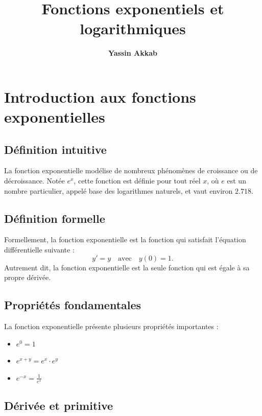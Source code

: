 \documentclass{article}
\title{\textbf{Fonctions exponentiels et  logarithmiques}}
\author{\textbf{Yassin Akkab}}
\begin{document}
	
	\maketitle
	
	
	
	\tableofcontents
	
	\newpage
	
	\section{Introduction aux fonctions exponentielles}
	
	\subsection{Définition intuitive}
	
	La fonction exponentielle modélise de nombreux phénomènes de croissance ou de décroissance. Notée \( e^x \), cette fonction est définie pour tout réel \( x \), où \( e \) est un nombre particulier, appelé base des logarithmes naturels, et vaut environ \( 2.718 \).
	
	\subsection{Définition formelle}
	
	Formellement, la fonction exponentielle est la fonction qui satisfait l'équation différentielle suivante :
	\[
	y' = y \quad \text{avec} \quad y(0) = 1.
	\]
	Autrement dit, la fonction exponentielle est la seule fonction qui est égale à sa propre dérivée.
	
	\subsection{Propriétés fondamentales}
	
	La fonction exponentielle présente plusieurs propriétés importantes :
	\begin{itemize}
		\item \( e^0 = 1 \)
		\item \( e^{x+y} = e^x \cdot e^y \)
		\item \( e^{-x} = \frac{1}{e^x} \)
	\end{itemize}
	
	\subsection{Dérivée et primitive}
	
\end{document}

